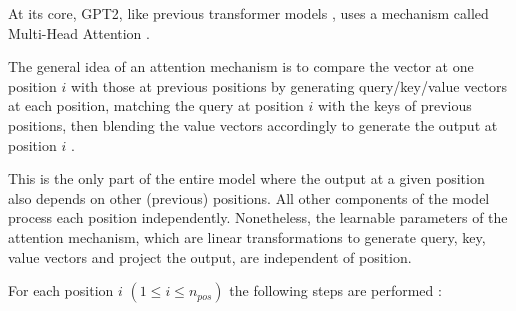 


At its core, GPT2, like previous transformer models , uses a mechanism called Multi-Head Attention .

The general idea of an attention mechanism is to compare the vector at one position $i$ with those at previous positions by generating query/key/value vectors at each position, matching the query at position $i$ with the keys of previous positions, then blending the value vectors accordingly to generate the output at position $i$ \cite{alammar-transformer} \cite{alammar-gpt2}.

This is the only part of the entire model where the output at a given position also depends on other (previous) positions. All other components of the model process each position independently.
Nonetheless, the learnable parameters of the attention mechanism, which are linear transformations to generate query, key, value vectors and project the output, are independent of position.


For each position $i$ $(1 \leq i \leq n_{pos})$ the following steps are performed  \cite{alammar-transformer} \cite{alammar-gpt2}:


